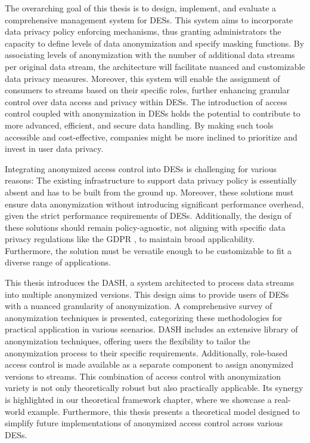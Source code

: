 The overarching goal of this thesis is to design, implement, and evaluate a comprehensive management system for \acp{DES}. This system aims to incorporate data privacy policy enforcing mechanisms, thus granting administrators the capacity to define levels of data anonymization and specify masking functions. By associating levels of anonymization with the number of additional data streams per original data stream, the architecture will facilitate nuanced and customizable data privacy measures. Moreover, this system will enable the assignment of consumers to streams based on their specific roles, further enhancing granular control over data access and privacy within \acp{DES}. The introduction of access control coupled with anonymization in \acp{DES} holds the potential to contribute to more advanced, efficient, and secure data handling. By making such tools accessible and cost-effective, companies might be more inclined to prioritize and invest in user data privacy.\par

Integrating anonymized access control into \acp{DES} is challenging for various reasons: The existing infrastructure to support data privacy policy is essentially absent and has to be built from the ground up. Moreover, these solutions must ensure data anonymization without introducing significant performance overhead, given the strict performance requirements of \acp{DES}. Additionally, the design of these solutions should remain policy-agnostic, not aligning with specific data privacy regulations like the \ac{GDPR} \cite{GDPR}, to maintain broad applicability. Furthermore, the solution must be versatile enough to be customizable to fit a diverse range of applications. \par

This thesis introduces the \acf{DASH}, a system architected to process data streams into multiple anonymized versions. This design aims to provide users of \acp{DES} with a nuanced granularity of anonymization. A comprehensive survey of anonymization techniques is presented, categorizing these methodologies for practical application in various scenarios. \ac{DASH} includes an extensive library of anonymization techniques, offering users the flexibility to tailor the anonymization process to their specific requirements. Additionally, role-based access control is made available as a separate component to assign anonymized versions to streams. This combination of access control with anonymization variety is not only theoretically robust but also practically applicable. Its synergy is highlighted in our theoretical framework chapter, where we showcase a real-world example. Furthermore, this thesis presents a theoretical model designed to simplify future implementations of anonymized access control across various \acp{DES}. \par

